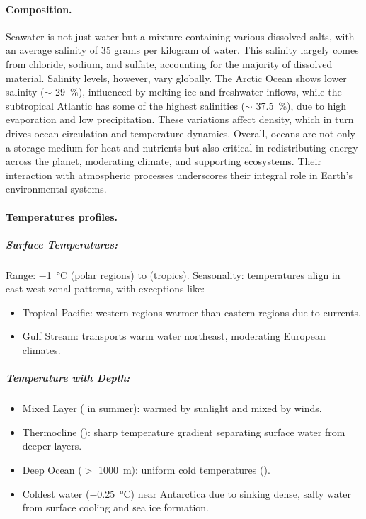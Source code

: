 \paragraph{Composition.} Seawater is not just water but a mixture containing various dissolved salts, with an average salinity of 35 grams per kilogram of water. This salinity largely comes from chloride, sodium, and sulfate, accounting for the majority of dissolved material. Salinity levels, however, vary globally. The Arctic Ocean shows lower salinity ($\sim$ \qty{29}{\percent}),
influenced by melting ice and freshwater inflows, while the subtropical Atlantic has some of the highest salinities ($\sim$ \qty{37.5}{\percent}), due to high evaporation and low precipitation. These variations affect density, which in turn drives ocean circulation and temperature dynamics.
Overall, oceans are not only a storage medium for heat and nutrients but also critical in redistributing energy across the planet, moderating climate, and supporting ecosystems. Their interaction with atmospheric processes underscores their integral role in Earth's environmental systems.
\paragraph{Temperatures profiles.}
\subparagraph{Surface Temperatures:}
Range: \qty{-1}{\celsius} (polar regions) to  (tropics).
Seasonality: temperatures align in east-west zonal patterns, with exceptions like:
\begin{itemize}
	\item Tropical Pacific: western regions warmer than eastern regions due to currents.
	\item Gulf Stream: transports warm water northeast, moderating European climates.
\end{itemize}

\subparagraph{Temperature with Depth:}
\begin{itemize}
	\item Mixed Layer ( in summer):
	      warmed by sunlight and mixed by winds.
	\item Thermocline ():
	      sharp temperature gradient separating surface water from deeper layers.
	\item Deep Ocean ($>$ \qty{1000}{\meter}):
	      uniform cold temperatures ().
	\item Coldest water (\qty{-0.25}{\celsius}) near Antarctica due to sinking dense, salty water from surface cooling and sea ice formation.
\end{itemize}

